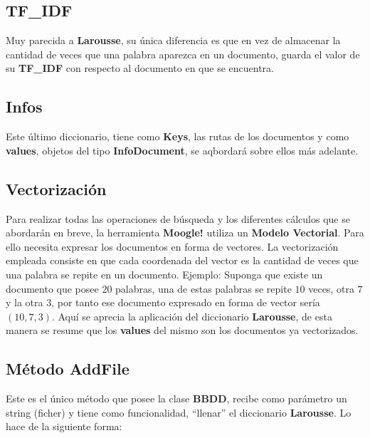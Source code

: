 \documentclass[10pt,a4paper]{article}
\begin{document}
\subsection{TF\_IDF}
\setlength{\parindent}{1em} Muy parecida a \textbf{Larousse}, su \'unica diferencia es que en vez de almacenar la cantidad de veces que una palabra aparezca en un documento, guarda el valor de su \textbf{TF\_IDF} con respecto al documento en que se encuentra.

\subsection{\textbf{Infos}}
\setlength{\parindent}{1em} Este \'ultimo diccionario, tiene como \textbf{Keys}, las rutas de los documentos y como \textbf{values}, objetos del tipo \textbf{InfoDocument}, se aqbordar\'a sobre ellos m\'as adelante.

\subsection{Vectorizaci\'on}
\setlength{\parindent}{1em} Para realizar todas las operaciones de b\'usqueda y los diferentes c\'alculos que se abordar\'an en breve, la herramienta \textbf{Moogle!} utiliza un \textbf{Modelo Vectorial}. Para ello necesita expresar los documentos en forma de vectores. La vectorizaci\'on empleada consiste en que cada coordenada del vector es la cantidad de veces que una palabra se repite en un documento. Ejemplo: Suponga que existe un documento que posee $20$ palabras, una de estas palabras se repite $10$ veces, otra $7$ y la otra $3$, por tanto ese documento expresado en forma de vector ser\'ia $(10,7,3)$. Aqu\'i se aprecia la aplicaci\'on del diccionario \textbf{Larousse}, de esta manera se resume que los \textbf{values} del mismo son los documentos ya vectorizados.

\subsection{M\'etodo AddFile}
\setlength{\parindent}{1em} Este es el \'unico m\'etodo que posee la clase \textbf{BBDD}, recibe como par\'ametro un string (ficher) y tiene como funcionalidad, ``llenar'' el diccionario \textbf{Larousse}. Lo hace de la siguiente forma:\\
\end{document}
